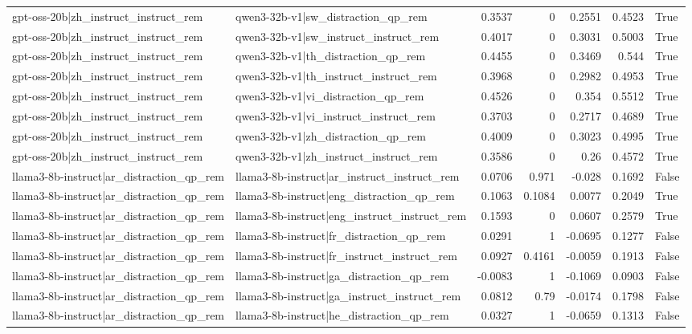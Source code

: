 \begin{table}
\begin{tabular}{l l r r r r l}
gpt-oss-20b|zh_instruct_instruct_rem & qwen3-32b-v1|sw_distraction_qp_rem & 0.3537 & 0 & 0.2551 & 0.4523 & True \\
gpt-oss-20b|zh_instruct_instruct_rem & qwen3-32b-v1|sw_instruct_instruct_rem & 0.4017 & 0 & 0.3031 & 0.5003 & True \\
gpt-oss-20b|zh_instruct_instruct_rem & qwen3-32b-v1|th_distraction_qp_rem & 0.4455 & 0 & 0.3469 & 0.544 & True \\
gpt-oss-20b|zh_instruct_instruct_rem & qwen3-32b-v1|th_instruct_instruct_rem & 0.3968 & 0 & 0.2982 & 0.4953 & True \\
gpt-oss-20b|zh_instruct_instruct_rem & qwen3-32b-v1|vi_distraction_qp_rem & 0.4526 & 0 & 0.354 & 0.5512 & True \\
gpt-oss-20b|zh_instruct_instruct_rem & qwen3-32b-v1|vi_instruct_instruct_rem & 0.3703 & 0 & 0.2717 & 0.4689 & True \\
gpt-oss-20b|zh_instruct_instruct_rem & qwen3-32b-v1|zh_distraction_qp_rem & 0.4009 & 0 & 0.3023 & 0.4995 & True \\
gpt-oss-20b|zh_instruct_instruct_rem & qwen3-32b-v1|zh_instruct_instruct_rem & 0.3586 & 0 & 0.26 & 0.4572 & True \\
llama3-8b-instruct|ar_distraction_qp_rem & llama3-8b-instruct|ar_instruct_instruct_rem & 0.0706 & 0.971 & -0.028 & 0.1692 & False \\
llama3-8b-instruct|ar_distraction_qp_rem & llama3-8b-instruct|eng_distraction_qp_rem & 0.1063 & 0.1084 & 0.0077 & 0.2049 & True \\
llama3-8b-instruct|ar_distraction_qp_rem & llama3-8b-instruct|eng_instruct_instruct_rem & 0.1593 & 0 & 0.0607 & 0.2579 & True \\
llama3-8b-instruct|ar_distraction_qp_rem & llama3-8b-instruct|fr_distraction_qp_rem & 0.0291 & 1 & -0.0695 & 0.1277 & False \\
llama3-8b-instruct|ar_distraction_qp_rem & llama3-8b-instruct|fr_instruct_instruct_rem & 0.0927 & 0.4161 & -0.0059 & 0.1913 & False \\
llama3-8b-instruct|ar_distraction_qp_rem & llama3-8b-instruct|ga_distraction_qp_rem & -0.0083 & 1 & -0.1069 & 0.0903 & False \\
llama3-8b-instruct|ar_distraction_qp_rem & llama3-8b-instruct|ga_instruct_instruct_rem & 0.0812 & 0.79 & -0.0174 & 0.1798 & False \\
llama3-8b-instruct|ar_distraction_qp_rem & llama3-8b-instruct|he_distraction_qp_rem & 0.0327 & 1 & -0.0659 & 0.1313 & False \\

\end{tabular}
\end{table}
